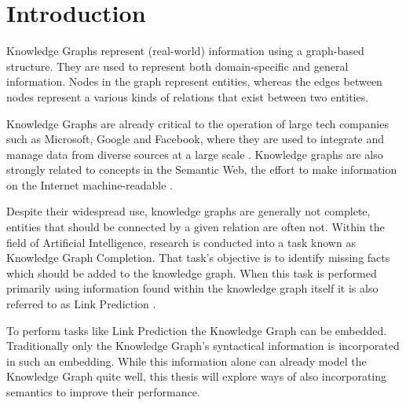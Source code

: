 \chapter{Introduction}
\label{ch:introduction}


Knowledge Graphs represent (real-world) information using a graph-based structure. 
They are used to represent both domain-specific and general information. Nodes in the graph represent entities, whereas the edges between nodes represent a various kinds of relations that exist between two entities.

Knowledge Graphs are already critical to the operation of large tech companies such as Microsoft, Google and Facebook, where they are used to integrate and manage data from diverse sources at a large scale . 
%
Knowledge graphs are also strongly related to concepts in the Semantic Web, the effort to make information on the Internet machine-readable . 

Despite their widespread use, knowledge graphs are generally not complete, entities that should be connected by a given relation are often not. Within the field of Artificial Intelligence, research is conducted into a task known as Knowledge Graph Completion. That task's objective is to identify missing facts which should be added to the knowledge graph. When this task is performed primarily using information found within the knowledge graph itself it is also referred to as Link Prediction .

To perform tasks like Link Prediction the Knowledge Graph can be embedded. Traditionally only the Knowledge Graph's syntactical information is incorporated in such an embedding. While this information alone can already model the Knowledge Graph quite well, this thesis will explore ways of also incorporating semantics to improve their performance.

